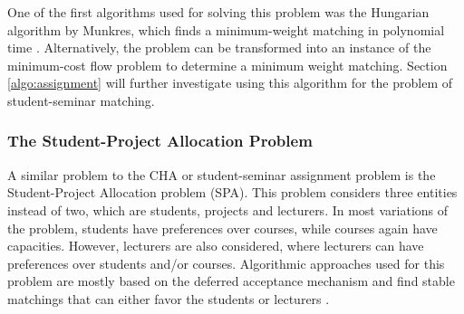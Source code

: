 One of the first algorithms used for solving this problem was the Hungarian algorithm by Munkres, which finds a minimum-weight matching in polynomial time \cite{Munkres}. 
Alternatively, the problem can be transformed into an instance of the minimum-cost flow problem to determine a minimum weight matching. Section \ref{algo:assignment} will further investigate using this algorithm for the problem of student-seminar matching.

\subsubsection{The Student-Project Allocation Problem}
A similar problem to the CHA or student-seminar assignment problem is the Student-Project Allocation problem (SPA). This problem considers three entities instead of two, which are students, projects and lecturers. In most variations of the problem, students have preferences over courses, while courses again have capacities. However, lecturers are also considered, where lecturers can have preferences over students and/or courses. Algorithmic approaches used for this problem are mostly based on the deferred acceptance mechanism and find stable matchings that can either favor the students or lecturers \cite{algorithmics}. 